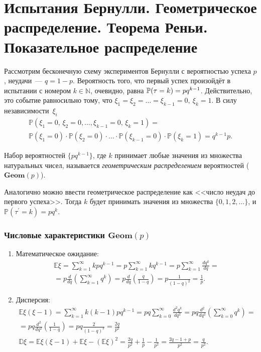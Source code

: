 \section{Испытания Бернулли. Геометрическое распределение. Теорема Реньи. Показательное распределение}

Рассмотрим бесконечную схему экспериментов Бернулли с вероятностью успеха $p$, неудачи~--- $q = 1 - p$. 
Вероятность того, что первый успех произойдёт в испытании с номером $k \in \mathbb{N}$, очевидно, равна ${\mathbb{P}(\tau = k)} = pq^{k-1}$.
Действительно, это событие равносильно тому, что $\xi_1 = \xi_2 = \ldots = \xi_{k-1} = 0,\: \xi_k = 1$. 
В силу независимости~$\xi_i$
\begin{multline*}
    \mathbb{P}(\xi_1 = 0,\, \xi_2 = 0, \ldots, \xi_{k-1} = 0,\, \xi_k = 1) = \\
    \mathbb{P}(\xi_1 = 0) \cdot \mathbb{P}(\xi_2 = 0) \cdot \ldots \cdot \mathbb{P}(\xi_{k-1} = 0) \cdot \mathbb{P}(\xi_k = 1) =
    q^{k-1}p.
\end{multline*}

\begin{defn}
    Набор вероятностей $\{p q^{k-1}\}$, где $k$ принимает любые значения из множества натуральных чисел, называется \textit{геометрическим распределением} вероятностей ($\mathbf{Geom}(p)$).
\end{defn}

Аналогично можно ввести геометрическое распределение как <<число неудач до первого успеха>>. 
Тогда $k$ будет принимать значения из множества $\{0, 1, 2, \ldots\}$, и $\mathbb{P}(\tau^{\prime} = k) = pq^k$.

\subsubsection{Числовые характеристики $\mathbf{Geom}(p)$}
\begin{enumerate}
    \item Математическое ожидание:
    \begin{multline*}
        \mathbb{E} \xi=\sum\limits_{k=1}^{\infty} k p q^{k-1}=p \sum\limits_{k=1}^{\infty} k q^{k-1}=p \sum\limits_{k=1}^{\infty} \frac{d q^{k}}{d q} = \\
        = p \frac{d}{d q}\left(\sum\limits_{k=1}^{\infty} q^{k}\right)=p \frac{d}{d q}\left(\frac{q}{1-q}\right)=p \frac{1}{(1-q)^{2}}=\frac{1}{p}.
    \end{multline*}
    \item Дисперсия:
    \begin{multline*}
        \mathbb{E} \xi(\xi-1)=\sum\limits_{k=1}^{\infty} k(k-1) p q^{k-1}=p q \sum\limits_{k=0}^{\infty} \frac{d^{2} q^{k}}{d q^{2}} =p q \frac{d^{2}}{d q^{2}}\left(\sum\limits_{k=0}^{\infty} q^{k}\right) = \\
        =p q \frac{d^{2}}{d q^{2}}\left(\frac{1}{1-q}\right)=p q \frac{2}{(1-q)^{3}}=\frac{2 q}{p^{2}} \\
        \mathbb{D} \xi=\mathbb{E} \xi(\xi-1)+\mathbb{E} \xi-(\mathbb{E} \xi)^{2}=\frac{2 q}{p^{2}}+\frac{1}{p}-\frac{1}{p^{2}}=\frac{2 q-1+p}{p^{2}}=\frac{q}{p^{2}}.
    \end{multline*}
\end{enumerate}

